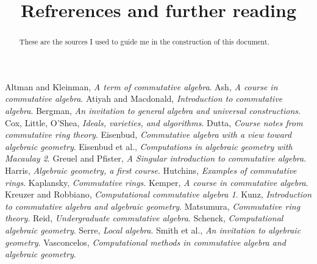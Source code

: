 \documentclass{ximera}
\title{Refrerences and further reading}
\begin{document}
\begin{abstract}
  These are the sources I used to guide me in the construction of this
  document.
\end{abstract}
\maketitle

\begin{thebibliography}{MMMM2002}
   Altman and Kleinman, \textit{A term of commutative algebra}.
   Ash, \textit{A course in commutative algebra}.
   Atiyah and Macdonald, \textit{Introduction to commutative algebra}.
   Bergman, \textit{An invitation to general algebra and universal constructions}.
   Cox, Little, O'Shea, \textit{Ideals, varieties, and algorithms}.
   Dutta, \textit{Course notes from commutative ring theory}.
   Eisenbud, \textit{Commutative algebra with a view toward algebraic geometry}.
   Eisenbud et al., \textit{Computations in algebraic geometry with Macaulay 2}.
   Greuel and Pfister, \textit{A Singular introduction to commutative algebra}.
   Harris, \textit{Algebraic geometry, a first course}.
   Hutchins, \textit{Examples of commutative rings}.
   Kaplansky, \textit{Commutative rings}.
   Kemper, \textit{A course in commutative algebra}.
   Kreuzer and Robbiano, \textit{Computational commutative algebra 1}.
   Kunz, \textit{Introduction to commutative algebra and algebraic geometry}.
   Matsumura, \textit{Commutative ring theory}.
   Reid, \textit{Undergraduate commutative algebra}.
   Schenck, \textit{Computational algebraic geometry}.
   Serre, \textit{Local algebra}.
   Smith et al., \textit{An invitation to algebraic geometry}.
   Vasconcelos, \textit{Computational methods in commutative algebra and algebraic geometry}.
\end{thebibliography}
\end{document}

